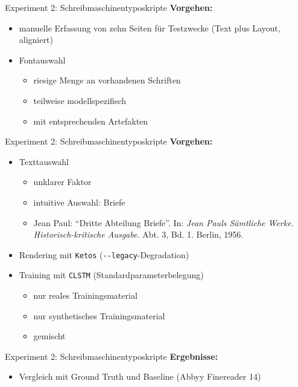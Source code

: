 \documentclass{bbawslides}
\begin{document}
\begin{bbawslide}{Experiment 2: Schreibmaschinentyposkripte}
  \vspace*{7mm}%
  \centerslidestrue%
  \textbf{Vorgehen:}
  \begin{itemize}
    \item manuelle Erfassung von zehn Seiten für Testzwecke (Text plus Layout, aligniert)
    \item Fontauswahl
    \begin{itemize}
      \item riesige Menge an vorhandenen Schriften
      \item teilweise modellspezifisch
      \item mit entsprechenden Artefakten
    \end{itemize}
  \end{itemize}
\end{bbawslide}

\begin{bbawslide}{Experiment 2: Schreibmaschinentyposkripte}
  \vspace*{7mm}%
  \centerslidestrue%
  \textbf{Vorgehen:}
  \begin{itemize}
    \item Texttauswahl
    \begin{itemize}\small
      \item unklarer Faktor
      \item intuitive Auswahl: Briefe
      \item Jean Paul: \enquote{Dritte Abteilung Briefe}. In: \emph{Jean Pauls Sämtliche Werke. Historisch-kritische Ausgabe}. Abt. 3, Bd. 1. Berlin, 1956.
    \end{itemize}
    \item Rendering mit \texttt{Ketos} (\verb_--_\texttt{legacy}-Degradation)
    \item Training mit \texttt{CLSTM} (Standardparameterbelegung)
    \begin{itemize}\small
      \item nur reales Trainingsmaterial
      \item nur synthetisches Trainingsmaterial
      \item gemischt
    \end{itemize}
  \end{itemize}
\end{bbawslide}

\begin{bbawslide}{Experiment 2: Schreibmaschinentyposkripte}
  \vspace*{7mm}%
  \centerslidestrue%
  \textbf{Ergebnisse:}
  \begin{itemize}
    \item Vergleich mit Ground Truth und Baseline (Abbyy Finereader 14)
  \end{itemize}
  \begin{tabular}{lr}
  \end{tabular}
\end{bbawslide}
\end{document}
